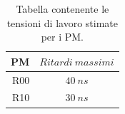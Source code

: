 \documentclass{standalone}
\begin{document}
	\begin{table}[h]                        %
		\begin{center}                          %
			\begin{tabular}{r|c}                  %
				\hline \hline                           %
				PM & $Ritardi\ massimi$\\           %
				\hline                                  %
				R00 & $40\ ns$ \\           %
				\hline                                  %
				R10 & $30\ ns$ \\
				\hline \hline                           %
			\end{tabular}
      \caption{Tabella contenente le tensioni di lavoro stimate per i PM.}
			\label{tab:delay}
		\end{center}
	\end{table}
\end{document}
